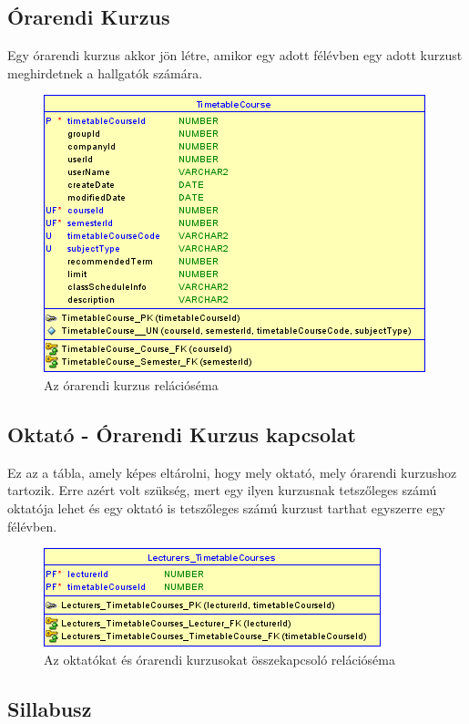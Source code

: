\documentclass[hidelinks, 12pt, a4paper]{report}
\begin{document}
\subsection{Órarendi Kurzus}

Egy órarendi kurzus akkor jön létre, amikor egy adott félévben egy adott kurzust meghirdetnek a hallgatók számára.

\begin{figure}[H]
    \centering
	\includegraphics{timetable_course.png}
	\caption{Az órarendi kurzus relációséma}
\end{figure}

\subsection{Oktató - Órarendi Kurzus kapcsolat}

Ez az a tábla, amely képes eltárolni, hogy mely oktató, mely órarendi kurzushoz tartozik. Erre azért volt szükség, mert egy ilyen kurzusnak tetszőleges számú oktatója lehet és egy oktató is tetszőleges számú kurzust tarthat egyszerre egy félévben.

\begin{figure}[H]
    \centering
	\includegraphics{lecturer_timetable_course.png}
	\caption{Az oktatókat és órarendi kurzusokat összekapcsoló relációséma}
\end{figure}

\subsection{Sillabusz}
\end{document}
